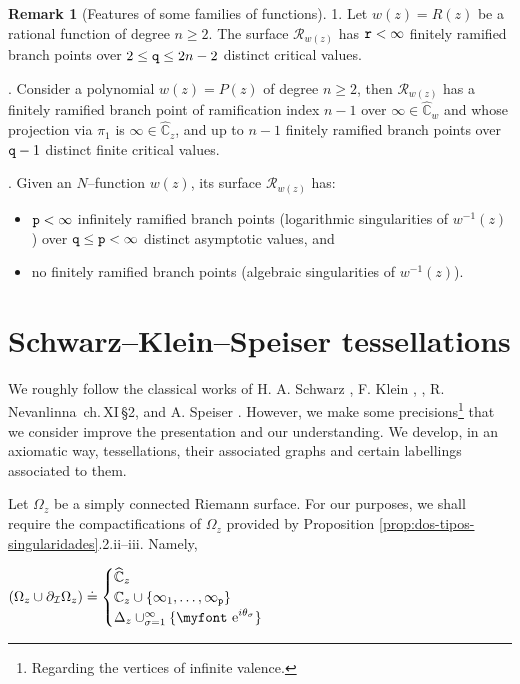 \documentclass[final,3p,times]{elsarticle}
\makeatletter
\newcommand{\CC}{\ensuremath{{\mathbb C}}}
\newcommand{\CW}{\ensuremath{{\widehat{\mathbb C}}}}
\newcommand{\R}{\ensuremath{{\mathcal R}}}
\newcommand{\e}{{\text{\myfont e}}}
\newcommand*\bigcdot{\mathpalette\bigcdot@{.5}}
\newcommand*\bigcdot@[2]{\mathbin{\vcenter{\hbox{\scalebox{#2}{$\m@th#1\bullet$}}}}}
\theoremstyle{definition}
\newtheorem{remark}[theorem]{Remark}
\makeatother
\begin{document}
\begin{remark}[Features of some families of functions]
1.
Let $w(z)=R(z)$ be a rational function of degree $n\geq 2$.
The surface $\R_{w(z)}$ has 
${\tt r}<\infty$ 
finitely ramified branch points 
over $2\leq {\tt q} \leq 2n-2$ 
distinct critical values.

.
Consider a polynomial $w(z)=P(z)$ of degree $n\geq 2$, then
$\R_{w(z)}$ has a finitely ramified branch point of ramification 
index $n-1$ over $\infty\in\CW_w$ and whose projection 
via $\pi_1$ is $\infty\in\CW_z$, 
and up to $n-1$ finitely ramified branch points over 
${\tt q}-1$ distinct finite critical values.

.
Given an $N$--function $w(z)$, its surface
$\R_{w(z)}$ has:
\begin{itemize}[label=$\bigcdot$ ,leftmargin=*]

\item
${\tt p}<\infty$ 
infinitely ramified branch points (logarithmic singularities of $w^{-1}(z)$) over 
${\tt q} \leq {\tt p}<\infty$
distinct asymptotic values, and 

\item
no finitely ramified branch points (algebraic singularities of $w^{-1}(z)$). 
\end{itemize}
\end{remark}


\section{Schwarz--Klein--Speiser tessellations}   
\label{sec:tessellations}

We roughly follow the classical works of 
H. A. Schwarz \cite{Schwarz}, 
F. Klein \cite{Klein}, \cite{Chislenko-Tschinkel},
R. Nevanlinna \cite{Nevanlinna2}\,ch.\,XI\,\S2, and 
A. Speiser \cite{Speiser}.
However, we make some precisions\footnote{
Regarding the vertices of infinite valence.}
that we consider improve the presentation and our understanding.
We develop, in an axiomatic way, tessellations, their associated graphs and certain labellings associated to them.

Let $\Omega_z$ be a simply connected Riemann surface.
For our purposes, we shall require the compactifications of $\Omega_z$
provided by Proposition \ref{prop:dos-tipos-singularidades}.2.ii--iii. 
Namely,

\centerline{
$(\Omega_z \cup \partial_{\mathcal{I}} \Omega_z) 
\doteq 
\begin{cases}
\CW_z 
\\
\CC_z\cup\{\infty_1,\ldots,\infty_{\tt p} \} 
\\
\Delta_z \cup_{\sigma =1}^\infty  \{ \e^{i \theta_{\sigma} } \}
\end{cases}$}
\end{document}
